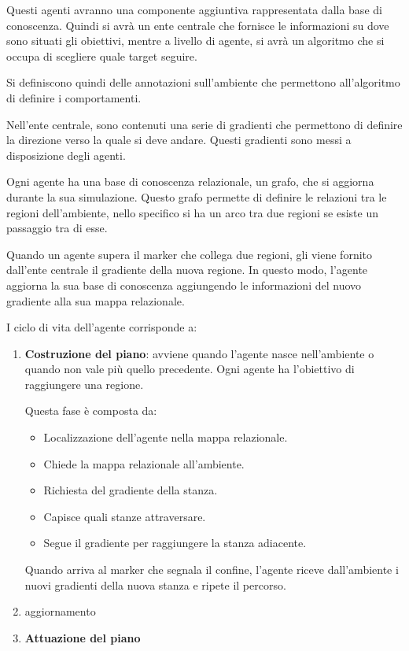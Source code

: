 Questi agenti avranno una componente aggiuntiva rappresentata dalla base di
conoscenza. Quindi si avrà un ente centrale che fornisce le informazioni su dove
sono situati gli obiettivi, mentre a livello di agente, si avrà un algoritmo che
si occupa di scegliere quale target seguire.

Si definiscono quindi delle annotazioni sull'ambiente che permettono all'algoritmo
di definire i comportamenti.

Nell'ente centrale, sono contenuti una serie di gradienti che permettono di
definire la direzione verso la quale si deve andare. Questi gradienti sono
messi a disposizione degli agenti.

Ogni agente ha una base di conoscenza relazionale, un grafo, che si aggiorna
durante la sua simulazione. Questo grafo permette di definire le relazioni tra
le regioni dell'ambiente, nello specifico si ha un arco tra due regioni se
esiste un passaggio tra di esse.

Quando un agente supera il marker che collega due regioni, gli viene fornito
dall'ente centrale il gradiente della nuova regione. In questo modo, l'agente
aggiorna la sua base di conoscenza aggiungendo le informazioni del nuovo gradiente
alla sua mappa relazionale.

I ciclo di vita dell'agente corrisponde a:
\begin{enumerate}
    \item \textbf{Costruzione del piano}: avviene quando l'agente nasce nell'ambiente
          o quando non vale più quello precedente. Ogni agente ha l'obiettivo di
          raggiungere una regione.

          Questa fase è composta da:
          \begin{itemize}
              \item Localizzazione dell'agente nella mappa relazionale.
              \item Chiede la mappa relazionale all'ambiente.
              \item Richiesta del gradiente della stanza.
              \item Capisce quali stanze attraversare.
              \item Segue il gradiente per raggiungere la stanza adiacente.
          \end{itemize}
          Quando arriva al marker che segnala il confine, l'agente riceve dall'ambiente
          i nuovi gradienti della nuova stanza e ripete il percorso.
    \item aggiornamento
    \item \textbf{Attuazione del piano}
\end{enumerate}

